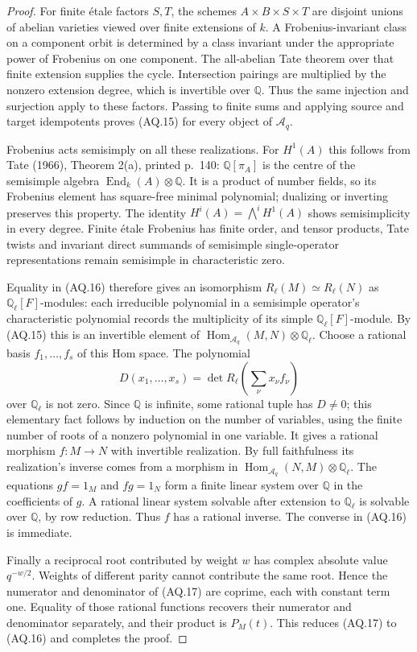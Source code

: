 \begin{proof}
For finite \'etale factors $S,T$, the schemes
$A\times B\times S\times T$ are disjoint unions
of abelian varieties viewed over finite extensions
of $k$. A Frobenius-invariant class on a component
orbit is determined by a class invariant under the
appropriate power of Frobenius on one component.
The all-abelian Tate theorem over that finite
extension supplies the cycle. Intersection pairings
are multiplied by the nonzero extension degree,
which is invertible over $\mathbb Q$. Thus the
same injection and surjection apply to these
factors. Passing to finite sums and applying
source and target idempotents proves (AQ.15)
for every object of $\mathcal A_q$.

Frobenius acts semisimply on all these realizations.
For $H^1(A)$ this follows from Tate (1966),
Theorem 2(a), printed p.~140: $\mathbb Q[\pi_A]$
is the centre of the semisimple algebra
$\operatorname{End}_k(A)\otimes\mathbb Q$.
It is a product of number fields, so its Frobenius
element has square-free minimal polynomial;
dualizing or inverting preserves this property.
The identity $H^i(A)=\bigwedge^i H^1(A)$ shows
semisimplicity in every degree. Finite \'etale
Frobenius has finite order, and tensor products,
Tate twists and invariant direct summands of
semisimple single-operator representations remain
semisimple in characteristic zero.

Equality in (AQ.16) therefore gives an isomorphism
$R_\ell(M)\simeq R_\ell(N)$ as
$\mathbb Q_\ell[F]$-modules: each irreducible
polynomial in a semisimple operator's characteristic
polynomial records the multiplicity of its simple
$\mathbb Q_\ell[F]$-module. By (AQ.15) this is
an invertible element of
$\operatorname{Hom}_{\mathcal A_q}(M,N)\otimes\mathbb Q_\ell$.
Choose a rational basis $f_1,\ldots,f_s$ of this
Hom space. The polynomial
\[
 D(x_1,\ldots,x_s)=
 \det R_\ell\!\left(\sum_\nu x_\nu f_\nu\right)
\]
over $\mathbb Q_\ell$ is not zero. Since
$\mathbb Q$ is infinite, some rational tuple
has $D\ne0$; this elementary fact follows by
induction on the number of variables, using the
finite number of roots of a nonzero polynomial
in one variable. It gives a rational morphism
$f:M\to N$ with invertible realization.
By full faithfulness its realization's inverse
comes from a morphism in
$\operatorname{Hom}_{\mathcal A_q}(N,M)\otimes\mathbb Q_\ell$.
The equations $gf=1_M$ and $fg=1_N$ form a
finite linear system over $\mathbb Q$ in the
coefficients of $g$. A rational linear system
solvable after extension to $\mathbb Q_\ell$
is solvable over $\mathbb Q$, by row reduction.
Thus $f$ has a rational inverse. The converse
in (AQ.16) is immediate.

Finally a reciprocal root contributed by weight
$w$ has complex absolute value $q^{-w/2}$.
Weights of different parity cannot contribute
the same root. Hence the numerator and denominator
of (AQ.17) are coprime, each with constant term
one. Equality of those rational functions
recovers their numerator and denominator separately,
and their product is $P_M(t)$. This reduces
(AQ.17) to (AQ.16) and completes the proof.
\end{proof}
